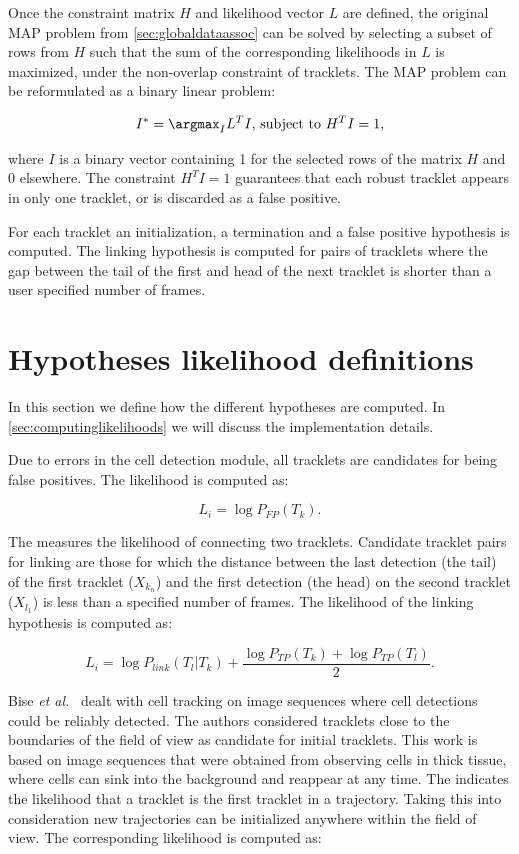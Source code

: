 		Once the constraint matrix $H$ and likelihood vector $L$ are defined, the original MAP problem from \cref{sec:globaldataassoc} can be solved by selecting a subset of rows from $H$ such that the sum of the corresponding likelihoods in $L$ is maximized, under the non-overlap constraint of tracklets. The MAP problem can be reformulated as a binary linear problem:
		
		\[
			I^* = \argmax_I L^T I \text{,    subject to } H^T I = 1 \text{,}
		\]
		
		\noindent where $I$ is a binary vector containing 1 for the selected rows of the matrix $H$ and 0 elsewhere. The constraint $H^T I = 1$ guarantees that each robust tracklet appears in only one tracklet, or is discarded as a false positive.
	 
		For each tracklet an initialization, a termination and a false positive hypothesis is computed. The linking hypothesis is computed for pairs of tracklets where the gap between the tail of the first and head of the next tracklet is shorter than a user specified number of frames.
	 	        		
	 	        		
	\section{Hypotheses likelihood definitions}
		\label{sec:hypothesisdefinition}
		In this section we define how the different hypotheses are computed. In \cref{sec:computinglikelihoods} we will discuss the implementation details.
		
		Due to errors in the cell detection module, all tracklets are candidates for being false positives. The  likelihood is computed as:
		
		\[
			L_i = \log P_{FP}(T_k)\text{.}
		\]
		
		The  measures the likelihood of connecting two tracklets. Candidate tracklet pairs for linking are those for which the distance between the last detection (the tail) of the first tracklet ($X_{k_n}$)  and the first detection (the head) on the second tracklet ($X_{l_1}$) is less than a specified number of frames. The likelihood of the linking hypothesis is computed as:
		
		\[
			L_i = \log P_{link}(T_l | T_k) + \frac{\log P_{TP}(T_k) + \log P_{TP}(T_l)}{2} \text{.}
		\]
		
		Bise \emph{et al.}~\cite{bise11global} dealt with cell tracking on image sequences where cell detections could be reliably detected. The authors considered tracklets close to the boundaries of the field of view as candidate for initial tracklets. This work is based on image sequences that were obtained from observing cells in thick tissue, where cells can sink into the background and reappear at any time. The  indicates the likelihood that a tracklet is the first tracklet in a trajectory. Taking this into consideration new trajectories can be initialized anywhere within the field of view. The corresponding likelihood is computed as:
		
